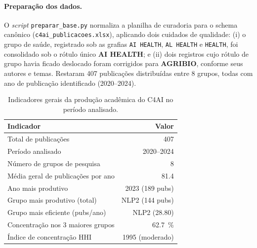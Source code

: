 \documentclass[12pt,a4paper]{article}
\begin{document}
\paragraph{Preparação dos dados.}
O \emph{script} \texttt{preparar\_base.py} normaliza a planilha de curadoria
para o schema canônico (\texttt{c4ai\_publicacoes.xlsx}), aplicando dois cuidados
de qualidade: (i) o grupo de saúde, registrado sob as grafias
\texttt{AI HEALTH}, \texttt{AL HEALTH} e \texttt{HEALTH}, foi consolidado sob o
rótulo único \textbf{AI HEALTH}; e (ii) dois registros cujo rótulo de grupo havia
ficado deslocado foram corrigidos para \textbf{AGRIBIO}, conforme seus autores e
temas. Restaram \num{407} publicações distribuídas entre \num{8} grupos, todas com ano de publicação identificado (2020--2024).

\begin{table}[H]
\centering
\caption{Indicadores gerais da produção acadêmica do C4AI no período analisado.}
\label{tab:indicadores}
\begin{tabular}{lr}
\toprule
\textbf{Indicador} & \textbf{Valor} \\
\midrule
Total de publicações                     & \num{407} \\
Período analisado                        & 2020--2024 \\
Número de grupos de pesquisa             & \num{8} \\
Média geral de publicações por ano       & \num{81.4} \\
Ano mais produtivo                       & 2023 (\num{189} pubs) \\
Grupo mais produtivo (total)             & NLP2 (\num{144} pubs) \\
Grupo mais eficiente (pubs/ano)          & NLP2 (\num{28.80}) \\
Concentração nos 3 maiores grupos        & \SI{62.7}{\percent} \\
Índice de concentração HHI               & \num{1995} (moderado) \\
\bottomrule
\end{tabular}
\end{table}
\end{document}
